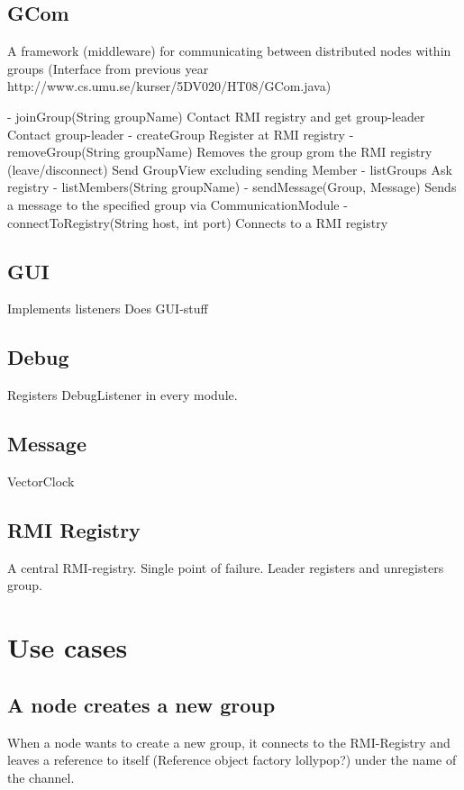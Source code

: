 \documentclass[11pt,swedish]{article}
\begin{document}
\subsection{GCom}
A framework (middleware) for communicating between distributed nodes within groups
	(Interface from previous year http://www.cs.umu.se/kurser/5DV020/HT08/GCom.java)

- joinGroup(String groupName)
	Contact RMI registry and get group-leader
	Contact group-leader
- createGroup
	Register at RMI registry
- removeGroup(String groupName)
	Removes the group grom the RMI registry
(leave/disconnect)
	Send GroupView excluding sending Member
- listGroups
	Ask registry
- listMembers(String groupName)
- sendMessage(Group, Message)
	Sends a message to the specified group via CommunicationModule
- connectToRegistry(String host, int port)
	Connects to a RMI registry


\subsection{GUI}
	Implements listeners
	Does GUI-stuff

\subsection{Debug}
Registers DebugListener in every module.

\subsection{Message}
	VectorClock

\subsection{RMI Registry}
A central RMI-registry. Single point of failure. Leader registers and unregisters group. 

\section{Use cases}

\subsection{A node creates a new group}
When a node wants to create a new group, it connects to the RMI-Registry and leaves a reference to itself (Reference object factory lollypop?) under the name of the channel.
\end{document}
